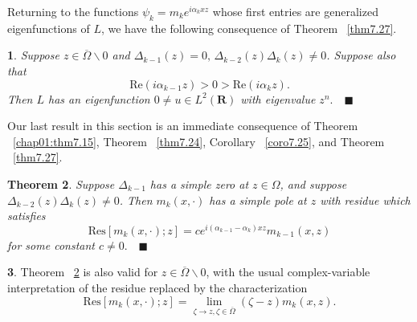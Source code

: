 \documentclass{surv-l}
\theoremstyle{plain}
\newtheorem{theorem}{Theorem}[section]
\newtheorem{cor}[theorem]{\sc{Corollary}}
\theoremstyle{definition}
\newtheorem{remark}[theorem]{\sc{Remark}}
\numberwithin{equation}{chapter}
\begin{document}
Returning to the functions $\psi_{k}=m_{k}e^{i\alpha_{k}xz}$ whose first entries are generalized eigenfunctions of $L$, we have the following consequence of Theorem ~\ref{thm7.27}.
\setcounter{theorem}{30}
\begin{cor}\label{coro7.31}
Suppose $z\in\overline{\Omega}\backslash 0$ and $\Delta_{k-1}(z)=0,\, \Delta_{k-2}(z)\Delta_{k}(z)\neq 0$. Suppose also that
\setcounter{equation}{31}
\begin{equation}\label{eq7.32}
\mathrm{Re}(i\alpha_{k-1}z)>0>\mathrm{Re}(i\alpha_{k}z).
\end{equation}
Then $L$ has an eigenfunction $0\neq u\in L^{2}(\mathbf{R})$ with eigenvalue $z^{n}.\quad \blacksquare$
\end{cor}
Our last result in this section is an immediate consequence of Theorem ~\ref{chap01:thm7.15}, Theorem ~\ref{thm7.24}, Corollary ~\ref{coro7.25}, and Theorem ~\ref{thm7.27}.
\setcounter{theorem}{32}
\begin{theorem}\label{thm7.33}
Suppose $\Delta_{k-1}$ has a simple zero at $ z\in\Omega$, and suppose $\Delta_{k-2}(z)\Delta_{k}(z)\neq 0$. Then $m_{k}(x, \cdot)$ has a simple pole at $z$ with residue which satisfies
\setcounter{equation}{33}
\begin{equation}\label{eq7.34}
\mathrm{Res}[m_{k}(x, \cdot);z]=ce^{i(\alpha_{k-1}-\alpha_{k})xz}m_{k-1}(x, z)
\end{equation}
for some constant $c\neq 0.\quad \blacksquare$
\end{theorem}
\setcounter{theorem}{34}
\begin{remark}\label{rem7.35}
Theorem ~\ref{thm7.33} is also valid for $z\in\overline{\Omega}\backslash 0$, with the usual complex-variable interpretation of the residue replaced by the characterization
\begin{equation*}
\mathrm{Res}[m_{k}(x, \cdot); z]=\lim_{\zeta\rightarrow z,\zeta\in\overline{\Omega}}(\zeta-z)m_{k}(x, z).
\end{equation*}
\end{remark}
\end{document}
